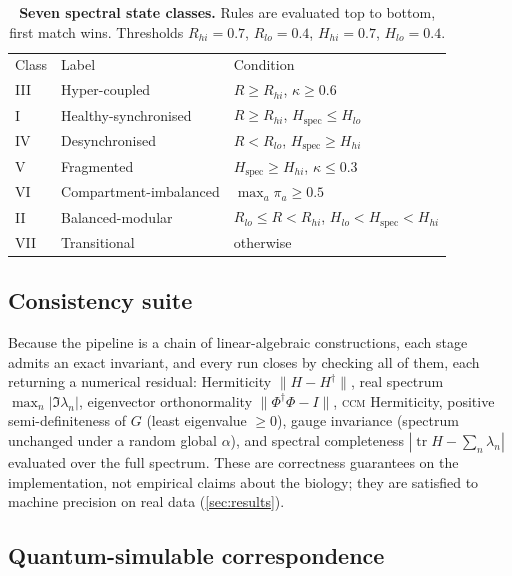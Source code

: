 \documentclass[preprint,12pt,amsmath,amssymb,superscriptaddress,floatfix]{revtex4-2}
\theoremstyle{definition}
\theoremstyle{plain}
\newcommand{\CCM}{\textsc{ccm}}
\newcommand{\Hspec}{H_{\mathrm{spec}}}
\begin{document}
\begin{table}[htbp]
\centering
\caption{\textbf{Seven spectral state classes.} Rules are
evaluated top to bottom, first match wins. Thresholds
$R_{hi}{=}0.7$, $R_{lo}{=}0.4$, $H_{hi}{=}0.7$, $H_{lo}{=}0.4$.}
\label{tab:taxonomy}
\small
\begin{ruledtabular}
\begin{tabular}{lll}
Class & Label & Condition \\
\colrule
III & Hyper-coupled          & $R\ge R_{hi}$, $\kappa\ge0.6$ \\
I   & Healthy-synchronised   & $R\ge R_{hi}$, $\Hspec\le H_{lo}$ \\
IV  & Desynchronised         & $R<R_{lo}$, $\Hspec\ge H_{hi}$ \\
V   & Fragmented             & $\Hspec\ge H_{hi}$, $\kappa\le0.3$ \\
VI  & Compartment-imbalanced & $\max_a\pi_a\ge0.5$ \\
II  & Balanced-modular       & $R_{lo}\le R<R_{hi}$, $H_{lo}<\Hspec<H_{hi}$ \\
VII & Transitional           & otherwise \\
\end{tabular}
\end{ruledtabular}
\end{table}

\subsection{Consistency suite}
\label{sec:theory-consistency}

Because the pipeline is a chain of linear-algebraic constructions, each stage
admits an exact invariant, and every run closes by checking all of them, each
returning a numerical residual: Hermiticity $\lVert H-H^{\dagger}\rVert$, real
spectrum $\max_n|\Im\lambda_n|$, eigenvector orthonormality
$\lVert\Phi^{\dagger}\Phi-I\rVert$, \CCM{} Hermiticity, positive
semi-definiteness of $G$ (least eigenvalue $\ge0$), gauge invariance (spectrum
unchanged under a random global $\alpha$), and spectral completeness
$|\operatorname{tr}H-\sum_n\lambda_n|$ evaluated over the full spectrum. These
are correctness guarantees on the implementation, not empirical claims about the
biology; they are satisfied to machine precision on real data
(\cref{sec:results}).

\subsection{Quantum-simulable correspondence}
\label{sec:theory-quantum}
\end{document}
